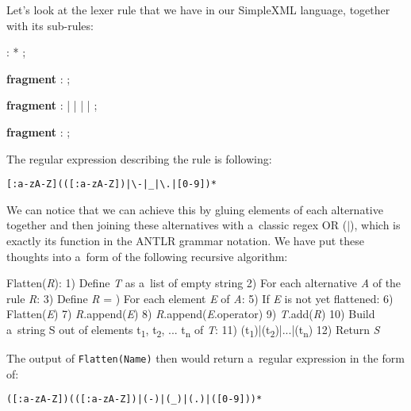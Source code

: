 \newpage

Let's look at the lexer rule  that we have in our SimpleXML language, together with its sub-rules:

\begin{antlr}
	         :    * ;

	\textbf{fragment}
	        :   \regex{[0-9]} ;

	\textbf{fragment}
	     :   
             |   \literal{-} | \literal{{\_}} | 
             |   
             ;

	\textbf{fragment}
	:   \regex{[:a-zA-Z]} ;
\end{antlr}

The regular expression describing the  rule is following:

\begin{center}
	\texttt{[:a-zA-Z](([:a-zA-Z])|\textbackslash-|{\_}|\textbackslash.|[0-9])*}
\end{center}

We can notice that we can achieve this by gluing elements of each alternative together and then joining these alternatives with a~classic regex OR ($|$), which is exactly its function in the ANTLR grammar notation.
We have put these thoughts into a~form of the following recursive algorithm:

\begin{antlr}
	Flatten(\textit{R}):
	1) Define \textit{T} as a~list of empty string
	2) For each alternative \textit{A} of the rule \textit{R}:
	3)     Define \textit{R} = \ap{})     For each element \textit{E} of \textit{A}:
	5)         If \textit{E} is not yet flattened:
	6)             Flatten(\textit{E})
	7)         \textit{R}.append(\textit{E})
	8)         \textit{R}.append(\textit{E}.operator)
	9)     \textit{T}.add(\textit{R})
	10) Build a~string S out of elements t\textsubscript{1}, t\textsubscript{2}, ... t\textsubscript{n} of \textit{T}:
	11)     (t\textsubscript{1})|(t\textsubscript{2})|...|(t\textsubscript{n})
	12) Return \textit{S}
\end{antlr}

The output of \texttt{Flatten(Name)} then would return a~regular expression in the form of:

\begin{center}
	\texttt{([:a-zA-Z])(([:a-zA-Z])|(-)|({\_})|(.)|([0-9]))*}
\end{center}

